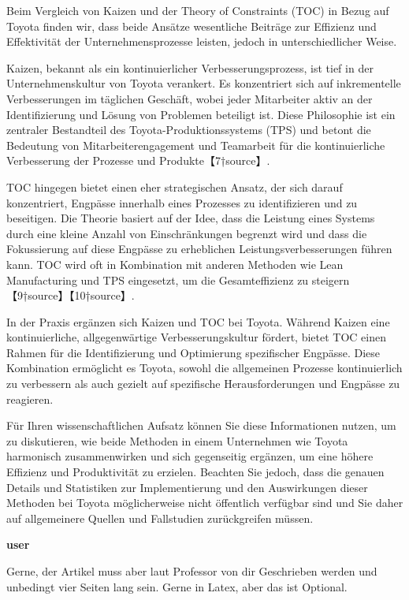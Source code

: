 Beim Vergleich von Kaizen und der Theory of Constraints (TOC) in Bezug auf Toyota finden wir, dass beide Ansätze wesentliche Beiträge zur Effizienz und Effektivität der Unternehmensprozesse leisten, jedoch in unterschiedlicher Weise.

Kaizen, bekannt als ein kontinuierlicher Verbesserungsprozess, ist tief in der Unternehmenskultur von Toyota verankert. Es konzentriert sich auf inkrementelle Verbesserungen im täglichen Geschäft, wobei jeder Mitarbeiter aktiv an der Identifizierung und Lösung von Problemen beteiligt ist. Diese Philosophie ist ein zentraler Bestandteil des Toyota-Produktionssystems (TPS) und betont die Bedeutung von Mitarbeiterengagement und Teamarbeit für die kontinuierliche Verbesserung der Prozesse und Produkte【7†source】.

TOC hingegen bietet einen eher strategischen Ansatz, der sich darauf konzentriert, Engpässe innerhalb eines Prozesses zu identifizieren und zu beseitigen. Die Theorie basiert auf der Idee, dass die Leistung eines Systems durch eine kleine Anzahl von Einschränkungen begrenzt wird und dass die Fokussierung auf diese Engpässe zu erheblichen Leistungsverbesserungen führen kann. TOC wird oft in Kombination mit anderen Methoden wie Lean Manufacturing und TPS eingesetzt, um die Gesamteffizienz zu steigern【9†source】【10†source】.

In der Praxis ergänzen sich Kaizen und TOC bei Toyota. Während Kaizen eine kontinuierliche, allgegenwärtige Verbesserungskultur fördert, bietet TOC einen Rahmen für die Identifizierung und Optimierung spezifischer Engpässe. Diese Kombination ermöglicht es Toyota, sowohl die allgemeinen Prozesse kontinuierlich zu verbessern als auch gezielt auf spezifische Herausforderungen und Engpässe zu reagieren.

Für Ihren wissenschaftlichen Aufsatz können Sie diese Informationen nutzen, um zu diskutieren, wie beide Methoden in einem Unternehmen wie Toyota harmonisch zusammenwirken und sich gegenseitig ergänzen, um eine höhere Effizienz und Produktivität zu erzielen. Beachten Sie jedoch, dass die genauen Details und Statistiken zur Implementierung und den Auswirkungen dieser Methoden bei Toyota möglicherweise nicht öffentlich verfügbar sind und Sie daher auf allgemeinere Quellen und Fallstudien zurückgreifen müssen.

\textbf{user}

Gerne, der Artikel muss aber laut Professor von dir Geschrieben werden und unbedingt vier Seiten lang sein. Gerne in Latex, aber das ist Optional. 

